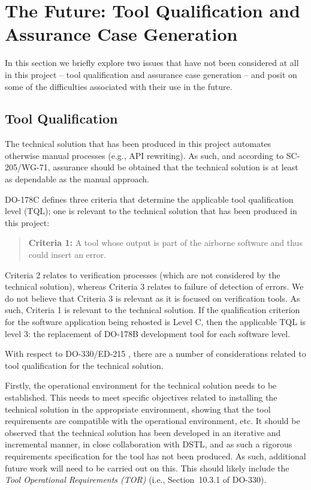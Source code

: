\documentclass{llncs}
\begin{document}
\section{The Future: Tool Qualification and Assurance Case Generation}
In this section we briefly explore two issues that have not been considered at all in this project -- tool qualification and assurance case generation -- and posit on some of the difficulties associated with their use in the future.

\subsection{Tool Qualification}
The technical solution that has been produced in this project automates otherwise manual processes (e.g., API rewriting). As such, and according to SC-205/WG-71, assurance should be obtained that the technical solution is at least as dependable as the manual approach. 

DO-178C defines three criteria that determine the applicable tool qualification level (TQL); one is relevant to the technical solution that has been produced in this project:

\begin{quotation}
\textbf{Criteria 1:} A tool whose output is part of the airborne software and thus could insert an error.
\end{quotation}
Criteria 2 relates to verification processes (which are not considered by the technical solution), whereas Criteria 3 relates to failure of detection of errors. We do not believe that Criteria 3 is relevant as it is focused on verification tools. As such, Criteria 1 is relevant to the technical solution. If the qualification criterion for the software application being rehosted is Level C, then the applicable TQL is level 3: the replacement of DO-178B development tool for each software level.

With respect to DO-330/ED-215 \cite{DO330}, there are a number of considerations related to tool qualification for the technical solution. 

Firstly, the operational environment for the technical solution needs to be established. This needs to meet specific objectives related to installing the technical solution in the appropriate environment, showing that the tool requirements are compatible with the operational environment, etc. It should be observed that the technical solution has been developed in an iterative and incremental manner, in close collaboration with DSTL, and as such a rigorous requirements specification for the tool has not been produced. As such, additional future work will need to be carried out on this. This should likely include the \textit{Tool Operational Requirements (TOR)} (i.e., Section~10.3.1 of DO-330). 
\end{document}
